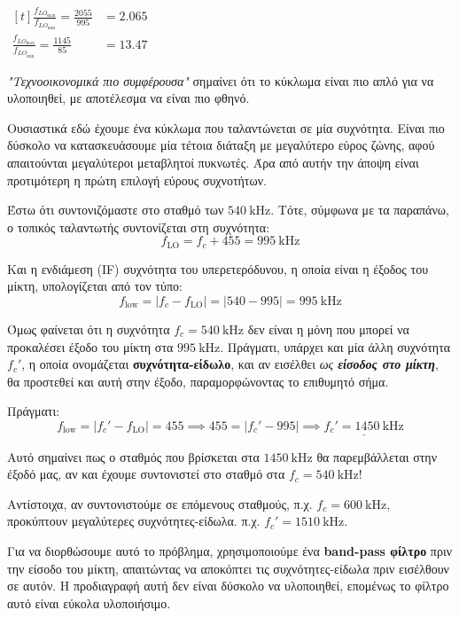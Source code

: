 \documentclass[11pt,a4paper,notitlepage,fleqn,final]{article}
\begin{document}
\begin{enumgreekparen}
	\item \(
	\begin{aligned}[t]
		\frac{f_{LO_{\max}}}{f_{LO_{\min}}}
		= \frac{2055}{995} &= 2.065 \\
		\frac{f_{LO_{\max}}}{f_{LO_{\min}}}
		= \frac{1145}{85} &= 13.47
	\end{aligned} \)
	
	\textit{"Τεχνοοικονομικά πιο συμφέρουσα"}
	σημαίνει ότι το κύκλωμα είναι πιο απλό για να
	υλοποιηθεί, με αποτέλεσμα να είναι πιο φθηνό.
	
	Ουσιαστικά εδώ έχουμε ένα κύκλωμα που ταλαντώνεται σε μία συχνότητα. Είναι
	πιο δύσκολο να κατασκευάσουμε μία τέτοια διάταξη με μεγαλύτερο εύρος ζώνης,
	αφού απαιτούνται μεγαλύτεροι μεταβλητοί πυκνωτές. Άρα από αυτήν την άποψη είναι προτιμότερη η πρώτη επιλογή
	εύρους συχνοτήτων.
	
	\item
	Έστω ότι συντονιζόμαστε στο σταθμό των \( \SI{540}{\kilo\hertz} \). Τότε, σύμφωνα με τα παραπάνω, ο τοπικός
	ταλαντωτής συντονίζεται στη συχνότητα:
	\[
	f_{\mathrm{LO}} = f_c + 455 = \SI{995}{\kilo\hertz}
	\]
	
	Και η ενδιάμεση (IF) συχνότητα του υπερετερόδυνου, η οποία είναι η έξοδος του μίκτη, υπολογίζεται από τον τύπο:
	\[
	f_{\mathrm{low}} = |f_c - f_\mathrm{LO}| = |540-995| = \SI{995}{\kilo\hertz}
	\]
	
	Όμως φαίνεται ότι η συχνότητα \( f_c = \SI{540}{\kilo\hertz} \) δεν είναι η μόνη που μπορεί να προκαλέσει έξοδο
	του μίκτη στα \( \SI{995}{\kilo\hertz} \). Πράγματι, υπάρχει και μία άλλη συχνότητα \( f_c' \), η οποία ονομάζεται
	\textbf{συχνότητα-είδωλο}, και αν εισέλθει \textit{ως \textbf{είσοδος στο μίκτη}}, θα προστεθεί και αυτή στην
	έξοδο, παραμορφώνοντας το επιθυμητό σήμα.
	
	Πράγματι:
	\[
	f_{\mathrm{low}} = |f_c' - f_\mathrm{LO}| = 455 \implies 455=|f_c' - 995| \implies
	\underline{f_c' = \SI{1450}{\kilo\hertz}}
	\]
	
	Αυτό σημαίνει πως ο σταθμός που βρίσκεται στα \( \SI{1450}{\kilo\hertz} \) θα παρεμβάλλεται στην έξοδό μας, αν και
	έχουμε συντονιστεί στο σταθμό στα \( f_c = \SI{540}{\kilo\hertz} \)!
	
	Αντίστοιχα, αν συντονιστούμε σε επόμενους σταθμούς, π.χ. \( f_c = \SI{600}{\kilo\hertz} \), προκύπτουν μεγαλύτερες
	συχνότητες-είδωλα. π.χ. \( f_c' = \SI{1510}{\kilo\hertz} \).
	
	Για να διορθώσουμε αυτό το πρόβλημα, χρησιμοποιούμε ένα \textbf{band-pass φίλτρο} πριν την είσοδο του μίκτη, απαιτώντας
	να αποκόπτει τις συχνότητες-είδωλα πριν εισέλθουν σε αυτόν. Η προδιαγραφή αυτή δεν είναι δύσκολο να υλοποιηθεί,
	επομένως το φίλτρο αυτό είναι εύκολα υλοποιήσιμο.
	

\end{enumgreekparen}
\end{document}
